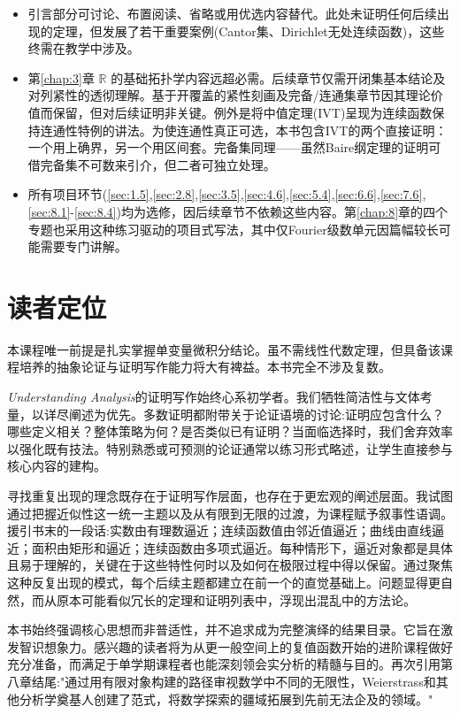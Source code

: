\begin{itemize}
\item 引言部分可讨论、布置阅读、省略或用优选内容替代。此处未证明任何后续出现的定理，但发展了若干重要案例(Cantor集、Dirichlet无处连续函数)，这些终需在教学中涉及。
\item 第\ref{chap:3}章 \(\mathbb{R}\) 的基础拓扑学内容远超必需。后续章节仅需开闭集基本结论及对列紧性的透彻理解。基于开覆盖的紧性刻画及完备/连通集章节因其理论价值而保留，但对后续证明非关键。例外是将中值定理(IVT)呈现为连续函数保持连通性特例的讲法。为使连通性真正可选，本书包含IVT的两个直接证明：一个用上确界，另一个用区间套。完备集同理——虽然Baire纲定理的证明可借完备集不可数来引介，但二者可独立处理。

\item 所有项目环节(\ref{sec:1.5},\ref{sec:2.8},\ref{sec:3.5},\ref{sec:4.6},\ref{sec:5.4},\ref{sec:6.6},\ref{sec:7.6},\ref{sec:8.1}-\ref{sec:8.4})均为选修，因后续章节不依赖这些内容。第\ref{chap:8}章的四个专题也采用这种练习驱动的项目式写法，其中仅Fourier级数单元因篇幅较长可能需要专门讲解。
\end{itemize}

\section*{读者定位}

本课程唯一前提是扎实掌握单变量微积分结论。虽不需线性代数定理，但具备该课程培养的抽象论证与证明写作能力将大有裨益。本书完全不涉及复数。

\textit{Understanding Analysis}的证明写作始终心系初学者。我们牺牲简洁性与文体考量，以详尽阐述为优先。多数证明都附带关于论证语境的讨论:证明应包含什么？哪些定义相关？整体策略为何？是否类似已有证明？当面临选择时，我们舍弃效率以强化既有技法。特别熟悉或可预测的论证通常以练习形式略述，让学生直接参与核心内容的建构。

寻找重复出现的理念既存在于证明写作层面，也存在于更宏观的阐述层面。我试图通过把握近似性这一统一主题以及从有限到无限的过渡，为课程赋予叙事性语调。援引书末的一段话:实数由有理数逼近；连续函数值由邻近值逼近；曲线由直线逼近；面积由矩形和逼近；连续函数由多项式逼近。每种情形下，逼近对象都是具体且易于理解的，关键在于这些特性何时以及如何在极限过程中得以保留。通过聚焦这种反复出现的模式，每个后续主题都建立在前一个的直觉基础上。问题显得更自然，而从原本可能看似冗长的定理和证明列表中，浮现出混乱中的方法论。

本书始终强调核心思想而非普适性，并不追求成为完整演绎的结果目录。它旨在激发智识想象力。感兴趣的读者将为从更一般空间上的复值函数开始的进阶课程做好充分准备，而满足于单学期课程者也能深刻领会实分析的精髓与目的。再次引用第八章结尾:"通过用有限对象构建的路径审视数学中不同的无限性，Weierstrass和其他分析学奠基人创建了范式，将数学探索的疆域拓展到先前无法企及的领域。"

